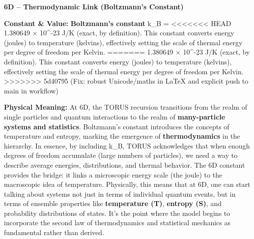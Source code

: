 \documentclass[]{article}
\begin{document}
\textbf{6D -- Thermodynamic Link (Boltzmann's Constant)}

\textbf{Constant \& Value:} \textbf{Boltzmann's constant} k\_B =
<<<<<<< HEAD
1.380649 × 10\^{}-23 J/K (exact, by definition)\hspace{0pt}. This
constant converts energy (joules) to temperature (kelvins), effectively
setting the scale of thermal energy per degree of freedom per Kelvin.
=======
1.380649 × 10\^{}-23 J/K (exact, by definition)​. This constant converts
energy (joules) to temperature (kelvins), effectively setting the scale
of thermal energy per degree of freedom per Kelvin.
>>>>>>> 5d40795 (Fix: robust Unicode/maths in LaTeX and explicit push to main in workflow)

\textbf{Physical Meaning:} At 6D, the TORUS recursion transitions from
the realm of single particles and quantum interactions to the realm of
\textbf{many-particle systems and statistics}. Boltzmann's constant
introduces the concepts of temperature and entropy, marking the
emergence of \textbf{thermodynamics} in the hierarchy​. In essence, by
including k\_B, TORUS acknowledges that when enough degrees of freedom
accumulate (large numbers of particles), we need a way to describe
average energies, distributions, and thermal behavior. The 6D constant
provides the bridge: it links a microscopic energy scale (the joule) to
the macroscopic idea of temperature. Physically, this means that at 6D,
one can start talking about systems not just in terms of individual
quantum events, but in terms of ensemble properties like
\textbf{temperature (T)}, \textbf{entropy (S)}, and probability
distributions of states. It's the point where the model begins to
incorporate the second law of thermodynamics and statistical mechanics
as fundamental rather than derived.
\end{document}
